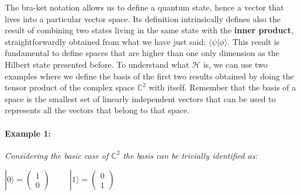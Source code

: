 \documentclass[english]{article}
\newcommand{\zeroket}{\begin{pmatrix} 1 \\ 0 \end{pmatrix}}
\begin{document}
			The bra-ket notation allows us to define a quantum state, hence a vector that lives into a particular vector space. Its definition intrinsically defines also the result of combining two states living in the same state with the \textbf{inner product}, straightforwardly obtained from what we have just said: $\langle\psi|\phi\rangle$. This result is fundamental to define spaces that are higher than one only dimension as the Hilbert state presented before. To understand what $\mathcal{H}$ is, we can use two examples where we define the basis of the first two results obtained by doing the tensor product of the complex space $\mathbb{C}^{2}$ with itself. Remember that the basis of a space is the smallest set of linearly independent vectors that can be used to represents all the vectors that belong to that space.
			
			\paragraph{Example 1:} 
			\label{ex:c2}
			\emph{Considering the basic case of $\mathbb{C}^{2}$ the basis can be trivially identified as:}
			\begin{center}
				$|0\rangle = \zeroket \hspace{1cm} |1\rangle = \begin{pmatrix} 0 \\ 1 \end{pmatrix}$
			\end{center}
		
\end{document}
